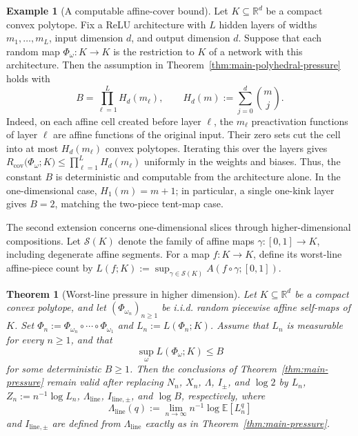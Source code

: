 \documentclass[11pt]{amsart}
\numberwithin{equation}{section}
\theoremstyle{plain}
\newtheorem{theorem}{Theorem}[section]
\theoremstyle{definition}
\newtheorem{example}{Example}[section]
\theoremstyle{remark}
\begin{document}
\begin{example}[A computable affine-cover bound]\label{ex:relu-cover-bound}
Let \(K\subseteq\mathbb R^d\) be a compact convex polytope. Fix a ReLU
architecture with \(L\) hidden layers of widths \(m_1,\dots,m_L\), input
dimension \(d\), and output dimension \(d\). Suppose that each random map
\(\Phi_\omega:K\to K\) is the restriction to \(K\) of a network with this
architecture. Then the assumption in Theorem~\ref{thm:main-polyhedral-pressure}
holds with
\[
B
=
\prod_{\ell=1}^L H_d(m_\ell),
\qquad
H_d(m):=\sum_{j=0}^d {m\choose j}.
\]
Indeed, on each affine cell created before layer \(\ell\), the \(m_\ell\)
preactivation functions of layer \(\ell\) are affine functions of the original
input. Their zero sets cut the cell into at most \(H_d(m_\ell)\) convex
polytopes. Iterating this over the layers gives
\(
R_{\mathrm{cov}}\big(\Phi_\omega;K\big)
\le
\prod_{\ell=1}^L H_d(m_\ell)
\)
uniformly in the weights and biases. Thus, the constant \(B\) is deterministic
and computable from the architecture alone. In the one-dimensional case,
\(H_1(m)=m+1\); in particular, a single one-kink layer gives \(B=2\), matching
the two-piece tent-map case.
\end{example}

The second extension concerns one-dimensional slices through higher-dimensional compositions. Let \(\mathcal S(K)\) denote the family of affine maps \(\gamma:[0,1]\to K\), including degenerate affine segments. For a map \(f:K\to K\), define its worst-line affine-piece count by \(L(f;K):=\sup_{\gamma\in\mathcal S(K)}A(f\circ\gamma;[0,1])\).

\begin{theorem}[Worst-line pressure in higher dimension]\label{thm:main-line-pressure}
Let \(K\subseteq\mathbb R^d\) be a compact convex polytope, and let \((\Phi_{\omega_n})_{n\ge1}\) be i.i.d. random piecewise affine self-maps of \(K\). Set \(\Phi_n:=\Phi_{\omega_n}\circ\cdots\circ\Phi_{\omega_1}\) and \(L_n:=L(\Phi_n;K)\). Assume that \(L_n\) is measurable for every \(n\ge1\), and that 
\[\sup_{\omega}L(\Phi_{\omega};K)\le B\] 
for some deterministic \(B\ge1\). Then the conclusions of Theorem~\ref{thm:main-pressure} remain valid after replacing \(N_n\), \(X_n\), \(\Lambda\), \(I_\pm\), and \(\log 2\) by \(L_n\), \(Z_n:=n^{-1}\log L_n\), \(\Lambda_{\mathrm{line}}\), \(I_{\mathrm{line},\pm}\), and \(\log B\), respectively, where
\[
\Lambda_{\mathrm{line}}(q):=\lim_{n\to\infty} n^{-1}\log\mathbb E[L_n^q]
\]
and \(I_{\mathrm{line},\pm}\) are defined from \(\Lambda_{\mathrm{line}}\) exactly as in Theorem~\ref{thm:main-pressure}.
\end{theorem}
\end{document}
